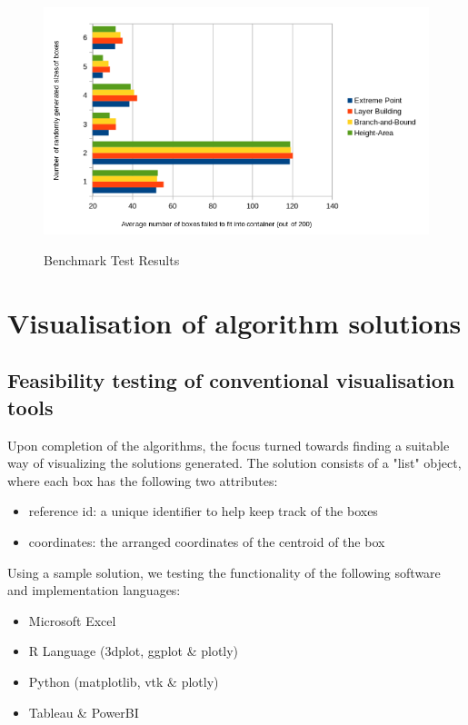 \documentclass[a4paper, 11pt]{article}
\begin{document}
\begin{figure}[h!]
\includegraphics[width=\linewidth]{./assets/201806271010.png}
\label{figure:figure1}
\caption{Benchmark Test Results}
\end{figure}

\pagebreak

\section*{Visualisation of algorithm solutions}

\subsection*{Feasibility testing of conventional visualisation tools}

Upon completion of the algorithms, the focus turned towards finding a suitable way of visualizing the solutions generated. The solution consists of a "list" object, where each box has the following two attributes:\begin{itemize}
\item reference id: a unique identifier to help keep track of the boxes
\item coordinates: the arranged coordinates of the centroid of the box
\end{itemize}

Using a sample solution, we testing the functionality of the following software and implementation languages:\begin{itemize}
\item Microsoft Excel
\item R Language (3dplot, ggplot \& plotly)
\item Python (matplotlib, vtk \& plotly)
\item Tableau \& PowerBI
\end{itemize}
\end{document}
